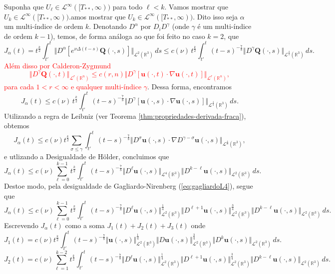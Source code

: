 \documentclass[a4paper, 11pt]{book}
\theoremstyle{definition}
\newcommand{\bR}{\mathbb{R}}
\newcommand{\bu}{\mathbf{u}}
\newcommand{\BQ}{\mathbf{Q}}
\newcommand{\cL}{\mathcal{L}}
\begin{document}
\begin{prf}
    Suponha que $U_{\ell} \in \cL^\infty([T_{**},\infty))$ para todo $\ell < k$. Vamos mostrar que $U_k \in \cL^\infty([T_{**},\infty))$.amos mostrar que $U_k \in \cL^\infty([T_{**},\infty))$. Dito isso seja $\alpha$ um multi-índice de ordem $k$.
    Denotando $D^\alpha$ por $D_i D^{\gamma}$ (onde $\gamma$ é um multi-índice de ordem $k-1$), temos, de forma análoga ao que foi feito no caso $k = 2$, que
    \[
        J_\alpha(t) = t^{\frac{k}{2}} \int_{t'}^t \Vert D^\alpha [ e^{\nu \Delta (t - s)}\BQ(\cdot,s)] \Vert_{\cL^2(\bR^3)} \,ds \leqslant c(\nu) \, t^{\frac{k}{2}} \int_{t'}^t (t - s)^{-\frac{7}{8}} \Vert D^{\gamma} \BQ(\cdot,s) \Vert_{\cL^\frac{4}{3}(\bR^3)} \,ds.
    \]
    \textcolor{red}{Além disso por Calderon-Zygmund
    \[
        \Vert D^{\gamma}\BQ(\cdot,t) \Vert_{\cL^r(\bR^n)} \leqslant c(r,n) \Vert D^{\gamma} [ \bu(\cdot,t) \cdot \nabla \bu(\cdot,t) ] \Vert_{\cL^r(\bR^n)},
    \]
    para cada $1 < r < \infty$ e qualquer multi-índice $\gamma$}. Dessa forma, encontramos
    \[
        J_\alpha(t) \leqslant c(\nu)\, t^{\frac{k}{2}} \int_{t'}^t (t-s)^{-\frac{7}{8}} \Vert D^{\gamma} [\bu(\cdot,s) \cdot \nabla \bu(\cdot,s)] \Vert_{\cL^\frac{4}{3}(\bR^3)}\,ds.
    \]
    Utilizando a regra de Leibniz (ver Teorema \ref{thm:propriedades-derivada-fraca}), obtemos
    \[
        J_\alpha(t) \leqslant c(\nu) t^{\frac{k}{2}} \sum_{\sigma \leqslant \gamma} \int_{t'}^t (t - s)^{-\frac{7}{8}} \Vert D^{\sigma} \bu(\cdot,s) \cdot \nabla D^{\gamma - \sigma} \bu(\cdot,s) \Vert_{\cL^{\frac{4}{3}}(\bR^3)},
    \]
    e utlizando a Desigualdade de Hölder, concluimos que
    \[
        J_\alpha(t) \leqslant c(\nu) \sum_{\ell = 0}^{k-1} t^{\frac{k}{2}} \int_{t'}^t (t- s)^{-\frac{7}{8}} \Vert D^\ell \bu(\cdot,s) \Vert_{\cL^4(\bR^3)} \Vert D^{k-\ell} \bu(\cdot,s) \Vert_{\cL^2(\bR^3)}\,ds.
    \]
    Destoe modo, pela desigualdade de Gagliardo-Nirenberg (\ref{eq:gagliardoL4}), segue que
    \[
        J_\alpha(t) \leqslant c(\nu) \sum_{\ell=0}^{k-1} t^{\frac{k}{2}} \int_{t'}^t ( t- s)^{-\frac{7}{8}} \Vert D^\ell \bu(\cdot,s) \Vert_{\cL^2(\bR^3)}^{\frac{1}{4}} \Vert D^{\ell + 1} \bu(\cdot,s) \Vert_{\cL^2(\bR^3)}^{\frac{3}{4}} \Vert D^{k-\ell} \bu(\cdot,s) \Vert_{\cL^2(\bR^3)} \,ds.
    \]
    Escrevendo $J_\alpha(t)$ como a soma $J_1(t) + J_2(t) + J_3(t)$ onde
    \[
        J_1(t) = c(\nu) t^{\frac{k}{2}} \int_{t'}^t ( t- s)^{-\frac{7}{8}} \Vert \bu(\cdot,s) \Vert_{\cL^2(\bR^3)}^{\frac{1}{4}} \Vert D \bu(\cdot,s) \Vert_{\cL^2(\bR^3)}^{\frac{3}{4}} \Vert D^{k} \bu(\cdot,s) \Vert_{\cL^2(\bR^3)} \,ds.
    \]
    \[
        J_2(t) = c(\nu) \sum_{\ell=1}^{k-2} t^{\frac{k}{2}} \int_{t'}^t ( t- s)^{-\frac{7}{8}} \Vert D^\ell \bu(\cdot,s) \Vert_{\cL^2(\bR^3)}^{\frac{1}{4}} \Vert D^{\ell + 1} \bu(\cdot,s) \Vert_{\cL^2(\bR^3)}^{\frac{3}{4}} \Vert D^{k-\ell} \bu(\cdot,s) \Vert_{\cL^2(\bR^3)} \,ds.
\]
\end{prf}
\end{document}
